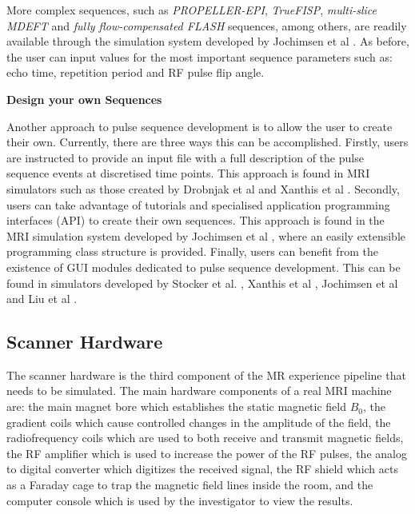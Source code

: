 \hfill

More complex sequences, such as \textit{PROPELLER-EPI}, \textit{TrueFISP}, \textit{multi-slice MDEFT} and \textit{fully flow-compensated FLASH} sequences, among others, are readily available through the simulation system developed by Jochimsen et al \cite{Jochimsen2004}.
As before, the user can input values for the most important sequence parameters such as: echo time, repetition period and RF pulse flip angle.


\hfill

\large \textbf{Design your own Sequences} \normalsize

Another approach to pulse sequence development is to allow the user to create their own.
Currently, there are three ways this can be accomplished.
Firstly, users are instructed to provide an input file with a full description of the pulse sequence events at discretised time points.
This approach is found in MRI simulators such as those created by Drobnjak et al \cite{Drobnjak2006} and Xanthis et al \cite{Xanthis2014}.
Secondly, users can take advantage of tutorials and specialised application programming interfaces (API) to create their own sequences.
This approach is found in the MRI simulation system developed by Jochimsen et al \cite{Jochimsen2004}, where an easily extensible programming class structure is provided.
Finally, users can benefit from the existence of GUI modules dedicated to pulse sequence development.
This can be found in simulators developed by Stocker et al. \cite{Stocker2010}, Xanthis et al \cite{Xanthis2014}, Jochimsen et al \cite{Jochimsen2004} and Liu et al \cite{Liu2013}.

\hfill

\subsection{Scanner Hardware}

The scanner hardware is the third component of the MR experience pipeline that needs to be simulated.
The main hardware components of a real MRI machine are: 
the main magnet bore which establishes the static magnetic field $B_0$, 
the gradient coils which cause controlled changes in the amplitude of the field,
the radiofrequency coils which are used to both receive and transmit magnetic fields,
the RF amplifier which is used to increase the power of the RF pulses,
the analog to digital converter which digitizes the received signal,
the RF shield which acts as a Faraday cage to trap the magnetic field lines inside the room, and
the computer console which is used by the investigator to view the results.


